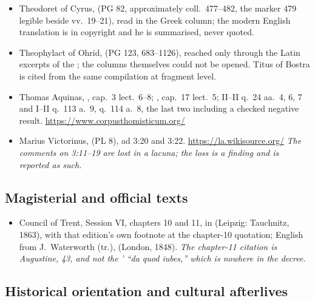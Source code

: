 \begin{itemize}[leftmargin=1.2em, itemsep=0.15em]
{all.}
\item Theodoret of Cyrus,  (PG 82,
approximately coll.\ 477--482, the marker 479 legible beside vv.~19--21), read
in the Greek column; the modern English translation is in copyright and he is
summarised, never quoted.
\item Theophylact of Ohrid,  (PG 123,
683--1126), reached only through the Latin excerpts of the ; the columns themselves could not be opened. Titus of Bostra is cited
from the same compilation at fragment level.
\item Thomas Aquinas, , cap.~3
lect.~6--8; , cap.~17 lect.~5;
 II--II q.~24 aa.~4, 6, 7 and I--II q.~113 a.~9,
q.~114 a.~8, the last two including a checked negative result.
\url{https://www.corpusthomisticum.org/}
\item Marius Victorinus,  (PL 8), ad 3:20
and 3:22. \url{https://la.wikisource.org/} \textit{The comments on 3:11--19 are
lost in a lacuna; the loss is a finding and is reported as such.}
\end{itemize}

\subsection*{Magisterial and official texts}

\begin{itemize}[leftmargin=1.2em, itemsep=0.15em]
\item Council of Trent, Session VI, chapters 10 and 11, in  (Leipzig: Tauchnitz,
1863), with that edition's own footnote  at the chapter-10 quotation; English from J.~Waterworth (tr.),
(London, 1848). \textit{The chapter-11 citation is Augustine,}  \textit{43, and not the} \textit{'
``da quod iubes,'' which is nowhere in the decree.}
\end{itemize}

\subsection*{Historical orientation and cultural afterlives}


